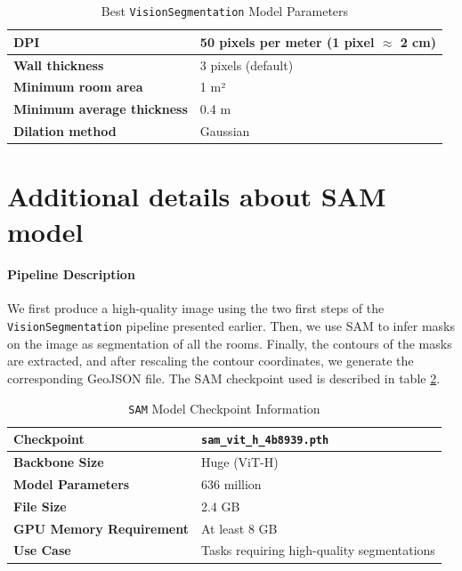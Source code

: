 \documentclass[11pt]{article}
\begin{document}
\begin{table}[htb!]
    \centering
    \begin{tabular}{|l|l|}
        \hline
        \textbf{DPI} & 50 pixels per meter (1 pixel $\approx$ 2 cm) \\ \hline
        \textbf{Wall thickness} & 3 pixels (default) \\ \hline
        \textbf{Minimum room area} & 1 m² \\ \hline
        \textbf{Minimum average thickness} & 0.4 m \\ \hline
        \textbf{Dilation method} & Gaussian \\ \hline
    \end{tabular}
    \caption{Best \texttt{VisionSegmentation} Model Parameters}
    \label{tab:CV_model_checkpoint}
\end{table}


\section{Additional details about SAM model}
\label{app:sec:SAMdetails}

\paragraph{Pipeline Description} 
We first produce a high-quality image using the 
two first steps of the \texttt{VisionSegmentation} pipeline presented earlier.
Then, we use SAM to infer masks on 
the image as segmentation of all the rooms. Finally, the contours of the masks 
are extracted, and after rescaling the contour coordinates, we generate the 
corresponding GeoJSON file. The SAM checkpoint used is described in table
\ref{tab:SAM_model_checkpoint}.

\begin{table}[htb!]
    \centering
    \begin{tabular}{|l|l|}
        \hline
        \textbf{Checkpoint} & \texttt{sam\_vit\_h\_4b8939.pth} \\ \hline
        \textbf{Backbone Size} & Huge (ViT-H) \\ \hline
        \textbf{Model Parameters} & 636 million \\ \hline
        \textbf{File Size} & 2.4 GB \\ \hline
        \textbf{GPU Memory Requirement} & At least 8 GB \\ \hline
        \textbf{Use Case} & Tasks requiring high-quality segmentations \\ \hline
    \end{tabular}
    \caption{\texttt{SAM} Model Checkpoint Information}
    \label{tab:SAM_model_checkpoint}
\end{table}
\end{document}
